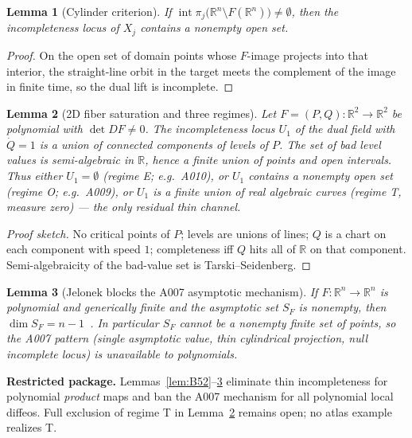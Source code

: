 ﻿\documentclass[11pt]{article}
\newtheorem{lemma}{Lemma}
\begin{document}
\begin{lemma}[Cylinder criterion]
\label{lem:B51}
If \(\operatorname{int}\pi_j\bigl(\mathbb{R}^n\setminus F(\mathbb{R}^n)\bigr)\neq\emptyset\),
then the incompleteness locus of \(X_j\) contains a nonempty open set.
\end{lemma}
\begin{proof}
On the open set of domain points whose \(F\)-image projects into that interior,
the straight-line orbit in the target meets the complement of the image in finite
time, so the dual lift is incomplete.
\end{proof}

\begin{lemma}[2D fiber saturation and three regimes]
\label{lem:B545}
Let \(F=(P,Q):\mathbb{R}^2\to\mathbb{R}^2\) be polynomial with \(\det DF\neq 0\).
The incompleteness locus \(U_1\) of the dual field with \(\dot Q=1\) is a union of
connected components of levels of \(P\). The set of bad level values is
semi-algebraic in \(\mathbb{R}\), hence a finite union of points and open intervals.
Thus either \(U_1=\emptyset\) (regime E; e.g.\ A010), or \(U_1\) contains a
nonempty open set (regime O; e.g.\ A009), or \(U_1\) is a finite union of real
algebraic curves (regime T, measure zero) --- the only residual thin channel.
\end{lemma}
\begin{proof}[Proof sketch]
No critical points of \(P\); levels are unions of lines; \(Q\) is a chart on each
component with speed \(1\); completeness iff \(Q\) hits all of \(\mathbb{R}\) on that
component. Semi-algebraicity of the bad-value set is Tarski--Seidenberg.
\end{proof}

\begin{lemma}[Jelonek blocks the A007 asymptotic mechanism]
\label{lem:B56}
If \(F:\mathbb{R}^n\to\mathbb{R}^n\) is polynomial and generically finite and the
asymptotic set \(S_F\) is nonempty, then \(\dim S_F=n-1\)~\cite{Jel93,Jel99}.
In particular \(S_F\) cannot be a nonempty finite set of points, so the A007
pattern (single asymptotic value, thin cylindrical projection, null incomplete
locus) is unavailable to polynomials.
\end{lemma}

\noindent\textbf{Restricted package.} Lemmas~\ref{lem:B52}--\ref{lem:B56} eliminate
thin incompleteness for polynomial \emph{product} maps and ban the A007 mechanism
for all polynomial local diffeos. Full exclusion of regime T in
Lemma~\ref{lem:B545} remains open; no atlas example realizes T.
\end{document}

